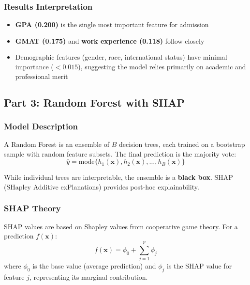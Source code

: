 \documentclass[12pt,a4paper]{article}
\begin{document}
\subsubsection{Results Interpretation}
\begin{itemize}
    \item \textbf{GPA (0.200)} is the single most important feature for admission
    \item \textbf{GMAT (0.175)} and \textbf{work experience (0.118)} follow closely
    \item Demographic features (gender, race, international status) have minimal importance ($<0.015$), suggesting the model relies primarily on academic and professional merit
\end{itemize}

\subsection{Part 3: Random Forest with SHAP}

\subsubsection{Model Description}
A Random Forest is an ensemble of $B$ decision trees, each trained on a bootstrap sample with random feature subsets. The final prediction is the majority vote:
\begin{equation}
    \hat{y} = \text{mode}\{h_1(\mathbf{x}), h_2(\mathbf{x}), \ldots, h_B(\mathbf{x})\}
\end{equation}

While individual trees are interpretable, the ensemble is a \textbf{black box}. SHAP (SHapley Additive exPlanations) provides post-hoc explainability.

\subsubsection{SHAP Theory}
SHAP values are based on Shapley values from cooperative game theory. For a prediction $f(\mathbf{x})$:
\begin{equation}
    f(\mathbf{x}) = \phi_0 + \sum_{j=1}^{p} \phi_j
\end{equation}
where $\phi_0$ is the base value (average prediction) and $\phi_j$ is the SHAP value for feature $j$, representing its marginal contribution.
\end{document}
